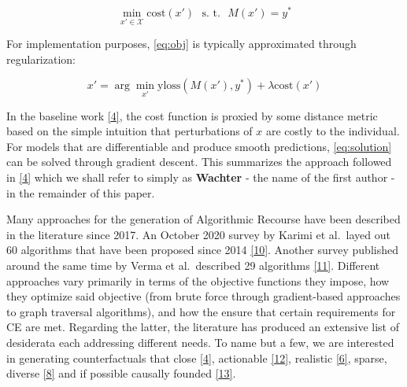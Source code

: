 \documentclass[conference,final,]{IEEEtran}
\begin{document}
\begin{equation}
\min_{x\prime \in \mathcal{X}} \text{cost}(x\prime) \ \ \ \mbox{s. t.} \ \ \ M(x\prime) = y^* \label{eq:obj}
\end{equation}

For implementation purposes, \eqref{eq:obj} is typically approximated through regularization:

\begin{equation}
x\prime = \arg \min_{x\prime}  \text{yloss}(M(x\prime),y^*) + \lambda \text{cost}(x\prime) \label{eq:solution}
\end{equation}

In the baseline work \protect\hyperlink{ref-wachter2017counterfactual}{{[}4{]}}, the cost function is proxied by some distance metric based on the simple intuition that perturbations of \(x\) are costly to the individual. For models that are differentiable and produce smooth predictions, \eqref{eq:solution} can be solved through gradient descent. This summarizes the approach followed in \protect\hyperlink{ref-wachter2017counterfactual}{{[}4{]}} which we shall refer to simply as \textbf{Wachter} - the name of the first author - in the remainder of this paper.

Many approaches for the generation of Algorithmic Recourse have been described in the literature since 2017. An October 2020 survey by Karimi et al.~layed out 60 algorithms that have been proposed since 2014 \protect\hyperlink{ref-karimi2020survey}{{[}10{]}}. Another survey published around the same time by Verma et al.~described 29 algorithms \protect\hyperlink{ref-verma2020counterfactual}{{[}11{]}}. Different approaches vary primarily in terms of the objective functions they impose, how they optimize said objective (from brute force through gradient-based approaches to graph traversal algorithms), and how the ensure that certain requirements for CE are met. Regarding the latter, the literature has produced an extensive list of desiderata each addressing different needs. To name but a few, we are interested in generating counterfactuals that close \protect\hyperlink{ref-wachter2017counterfactual}{{[}4{]}}, actionable \protect\hyperlink{ref-ustun2019actionable}{{[}12{]}}, realistic \protect\hyperlink{ref-schut2021generating}{{[}6{]}}, sparse, diverse \protect\hyperlink{ref-mothilal2020explaining}{{[}8{]}} and if possible causally founded \protect\hyperlink{ref-karimi2021algorithmic}{{[}13{]}}.
\end{document}
